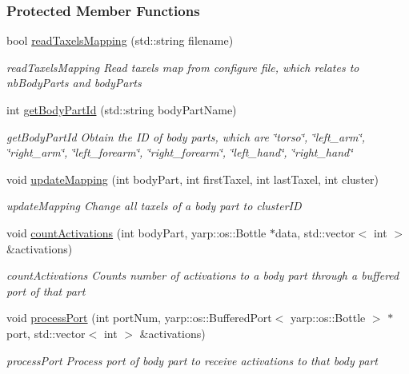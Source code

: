 \subsubsection*{Protected Member Functions}
\begin{DoxyCompactItemize}
\item 
bool \hyperlink{group__touchDetector_a4f791998bc682a7c798acc52a955b893}{read\+Taxels\+Mapping} (std\+::string filename)
\begin{DoxyCompactList}\small\item\em read\+Taxels\+Mapping Read taxels map from configure file, which relates to nb\+Body\+Parts and body\+Parts \end{DoxyCompactList}\item 
int \hyperlink{group__touchDetector_adf2f44c74c144b80973bd626b3d7dfb0}{get\+Body\+Part\+Id} (std\+::string body\+Part\+Name)
\begin{DoxyCompactList}\small\item\em get\+Body\+Part\+Id Obtain the ID of body parts, which are \char`\"{}torso\char`\"{}, \char`\"{}left\+\_\+arm\char`\"{}, \char`\"{}right\+\_\+arm\char`\"{}, \char`\"{}left\+\_\+forearm\char`\"{}, \char`\"{}right\+\_\+forearm\char`\"{}, \char`\"{}left\+\_\+hand\char`\"{}, \char`\"{}right\+\_\+hand\char`\"{} \end{DoxyCompactList}\item 
void \hyperlink{group__touchDetector_a5c469380b1121fe2f21c5836cfcb3cac}{update\+Mapping} (int body\+Part, int first\+Taxel, int last\+Taxel, int cluster)
\begin{DoxyCompactList}\small\item\em update\+Mapping Change all taxels of a body part to cluster\+ID \end{DoxyCompactList}\item 
void \hyperlink{group__touchDetector_ae291de595b3d48923598f305a77b68f1}{count\+Activations} (int body\+Part, yarp\+::os\+::\+Bottle $\ast$data, std\+::vector$<$ int $>$ \&activations)
\begin{DoxyCompactList}\small\item\em count\+Activations Counts number of activations to a body part through a buffered port of that part \end{DoxyCompactList}\item 
void \hyperlink{group__touchDetector_a9ce7b3cf367b16ecf074655ccd882194}{process\+Port} (int port\+Num, yarp\+::os\+::\+Buffered\+Port$<$ yarp\+::os\+::\+Bottle $>$ $\ast$port, std\+::vector$<$ int $>$ \&activations)
\begin{DoxyCompactList}\small\item\em process\+Port Process port of body part to receive activations to that body part \end{DoxyCompactList}\end{DoxyCompactItemize}
